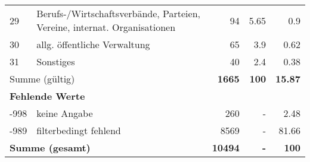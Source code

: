\begin{longtable}{lXrrr}
        29 & \multicolumn{1}{X}{Berufs-/Wirtschaftsverbände, Parteien, Vereine, internat. Organisationen} & %
          \num{94} &
          \num[round-mode=places,round-precision=2]{5,65} &
          \num[round-mode=places,round-precision=2]{0,9} \\

        30 & \multicolumn{1}{X}{allg. öffentliche Verwaltung} & %
          \num{65} &
          \num[round-mode=places,round-precision=2]{3,9} &
          \num[round-mode=places,round-precision=2]{0,62} \\

        31 & \multicolumn{1}{X}{Sonstiges} & %
          \num{40} &
          \num[round-mode=places,round-precision=2]{2,4} &
          \num[round-mode=places,round-precision=2]{0,38} \\

     \midrule
     \multicolumn{2}{l}{Summe (gültig)} &
       \textbf{\num{1665}} &
     \textbf{100} &
       \textbf{\num[round-mode=places,round-precision=2]{15,87}} \\
     \multicolumn{5}{l}{\textbf{Fehlende Werte}}\\
       -998 &
       keine Angabe &
         \num{260} &
        - &
         \num[round-mode=places,round-precision=2]{2,48} \\
       -989 &
       filterbedingt fehlend &
         \num{8569} &
        - &
         \num[round-mode=places,round-precision=2]{81,66} \\
     \midrule
     \multicolumn{2}{l}{\textbf{Summe (gesamt)}} &
          \textbf{\num{10494}} &
        \textbf{-} &
        \textbf{100} \\
     \bottomrule
     \end{longtable}
     
